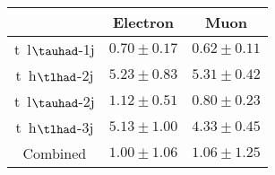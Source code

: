 \centering
\begin{tabular}{|c|c|c|} \hline
 & Electron & Muon\\\hline
t~{l}$\tauhad$-1j & $0.70\pm0.17$ & $0.62\pm0.11$\\\hline
t~{h}$\tlhad$-2j & $5.23\pm0.83$ & $5.31\pm0.42$\\\hline
t~{l}$\tauhad$-2j & $1.12\pm0.51$ & $0.80\pm0.23$\\\hline
t~{h}$\tlhad$-3j & $5.13\pm1.00$ & $4.33\pm0.45$\\\hline
Combined & $1.00\pm1.06$ & $1.06\pm1.25$\\\hline
\end{tabular}
